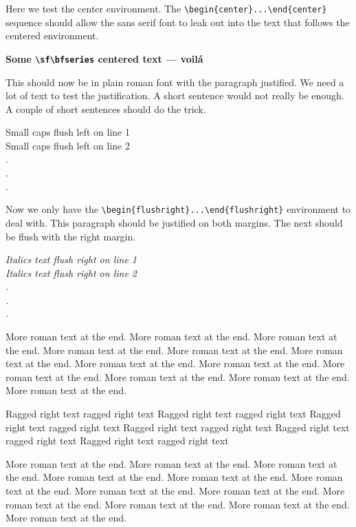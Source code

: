 ﻿\documentclass{article}
\begin{document}
Here we test the center environment.  The \verb#\begin{center}...\end{center}#
sequence should allow the sans serif font to leak out into the text that follows
the centered environment. 
\begin{center}
\sf\bfseries Some \verb#\sf\bfseries# centered text --- voil\'a
\end{center}
This should now be in plain roman font with the paragraph justified.
We need a lot of text to test the justification.  A short sentence would
not really be enough.  A couple of short sentences should do the trick.
\begin{flushleft}
\sc Small caps flush left on line 1 \\
Small caps flush left on line 2 \\
.\\
.\\
.\\
\end{flushleft}
Now we only have the \verb#\begin{flushright}...\end{flushright}# environment
to deal with.  This paragraph should be justified on both margins. The next should
be flush with the right margin.

\begin{flushright}
\itshape 
Italics text flush right on line 1 \\
Italics text flush right on line 2 \\
.\\
.\\
.\\
\end{flushright}

More roman text at the end. More roman text at the end. More roman text at the end. 
More roman text at the end. More roman text at the end. More roman text at the end.
More roman text at the end. More roman text at the end. More roman text at the end.
More roman text at the end. More roman text at the end. More roman text at the end.

{\raggedright
Ragged right text ragged right text Ragged right text ragged right text
Ragged right text ragged right text Ragged right text ragged right text
Ragged right text ragged right text Ragged right text ragged right text\par}


More roman text at the end. More roman text at the end. More roman text at the end. 
More roman text at the end. More roman text at the end. More roman text at the end.
More roman text at the end. More roman text at the end. More roman text at the end.
More roman text at the end. More roman text at the end. More roman text at the end.
\end{document}
